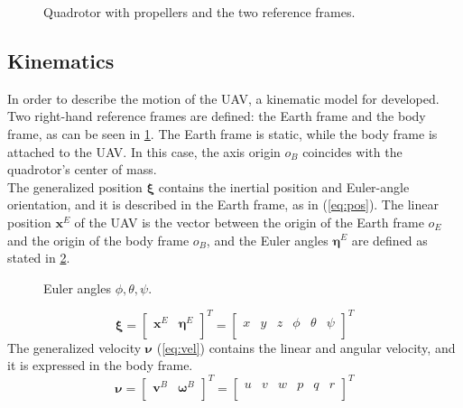 \documentclass[journal]{IEEEtran}
\begin{document}
	\begin{figure}[h]
		\centering
		
		\caption{Quadrotor with propellers and the two reference frames.}
		\label{fig:frames_rotors}
	\end{figure}
	
	\subsection{Kinematics}
	In order to describe the motion of the UAV, a kinematic model for  developed. Two right-hand reference frames are defined: the Earth frame and the body frame, as can be seen in \figurename{ {}\ref{fig:frames_rotors}}. The Earth frame is static, while the body frame is attached to the UAV. In this case, the axis origin $o_B$ coincides with the quadrotor's center of mass.\\

	The generalized position $\bm{\xi}$ contains the inertial position and Euler-angle orientation, and it is described in the Earth frame, as in (\ref{eq:pos}). The linear position $\bm{x}^E$ of the UAV is the vector between the origin of the Earth frame $o_E$ and the origin of the body frame $o_B$, and the Euler angles $\bm{\eta}^E$ are defined as stated in \figurename{ \ref{fig:roll_pitch_yaw}}.
	
	\begin{figure}[h]
		\centering
		
		
		
		\caption{Euler angles $\phi, \theta, \psi$.}
		\label{fig:roll_pitch_yaw}
	\end{figure}

	\begin{equation} \label{eq:pos}
	\bm{\xi} = \left[ \begin{array}{cc}
	\bm{x}^E & \bm{\eta}^E \\
	\end{array}\right]^T = \left[ \begin{array}{cccccc}
	x & y & z & \phi & \theta & \psi\\
	\end{array}\right] ^T
	\end{equation}  
	The generalized velocity $\bm{\nu}$ (\ref{eq:vel}) contains the linear and angular velocity, and it is expressed in the body frame.
	\begin{equation} \label{eq:vel}
	\bm{\nu} = \left[ \begin{array}{cc}
	\bm{v}^B & \bm{\omega}^B \\
	\end{array}\right]^T = \left[ \begin{array}{cccccc}
	u & v & w & p & q & r\\
	\end{array}\right] ^T 
	\end{equation}
	
\end{document}

